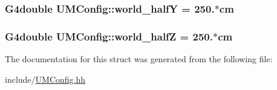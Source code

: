 \subsubsection[{world\+\_\+half\+Y}]{\setlength{\rightskip}{0pt plus 5cm}G4double U\+M\+Config\+::world\+\_\+half\+Y = 250.$\ast$cm}\label{structUMConfig_af679f960918ff62d3cee8a9981ffdc2c}
\hypertarget{structUMConfig_a762a80fecef0cb5fbc95edf19275cfce}{}
\subsubsection[{world\+\_\+half\+Z}]{\setlength{\rightskip}{0pt plus 5cm}G4double U\+M\+Config\+::world\+\_\+half\+Z = 250.$\ast$cm}\label{structUMConfig_a762a80fecef0cb5fbc95edf19275cfce}


The documentation for this struct was generated from the following file\+:\begin{DoxyCompactItemize}
\item 
include/\hyperlink{UMConfig_8hh}{U\+M\+Config.\+hh}\end{DoxyCompactItemize}

